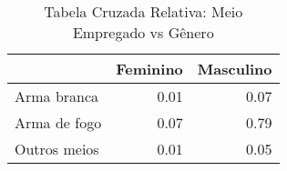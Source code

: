 \begin{table}[ht]
\centering
\begin{tabular}{lrr}
  \hline
 & Feminino & Masculino \\ 
  \hline
Arma branca & 0.01 & 0.07 \\ 
  Arma de fogo & 0.07 & 0.79 \\ 
  Outros meios & 0.01 & 0.05 \\ 
   \hline
\end{tabular}
\caption{Tabela Cruzada Relativa: Meio Empregado vs Gênero} 
\end{table}
